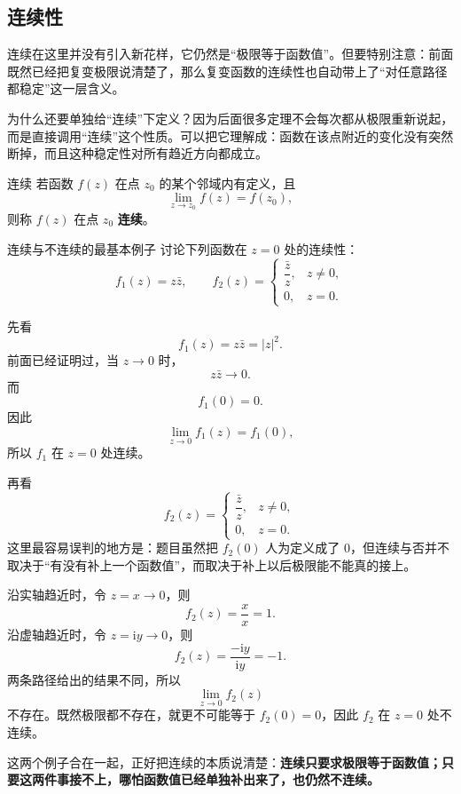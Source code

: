 \subsection{连续性}

连续在这里并没有引入新花样，它仍然是``极限等于函数值''。但要特别注意：前面既然已经把复变极限说清楚了，那么复变函数的连续性也自动带上了``对任意路径都稳定''这一层含义。

为什么还要单独给``连续''下定义？因为后面很多定理不会每次都从极限重新说起，而是直接调用``连续''这个性质。可以把它理解成：函数在该点附近的变化没有突然断掉，而且这种稳定性对所有趋近方向都成立。

\begin{dingliyi}{连续}{}
若函数 $f(z)$ 在点 $z_0$ 的某个邻域内有定义，且
\begin{equation}
    \lim_{z\to z_0}f(z)=f(z_0),
\end{equation}
则称 $f(z)$ 在点 $z_0$ \textbf{连续}。
\end{dingliyi}

\begin{lizi}{连续与不连续的最基本例子}{}
讨论下列函数在 $z=0$ 处的连续性：
\[
    f_1(z)=z\bar z,\qquad
    f_2(z)=
    \begin{cases}
        \dfrac{\bar z}{z},& z\neq 0,\\
        0,& z=0.
    \end{cases}
\]

\begin{jie}
先看
\[
    f_1(z)=z\bar z=|z|^2.
\]
前面已经证明过，当 $z\to 0$ 时，
\[
    z\bar z\to 0.
\]
而
\[
    f_1(0)=0.
\]
因此
\[
    \lim_{z\to 0}f_1(z)=f_1(0),
\]
所以 $f_1$ 在 $z=0$ 处连续。

再看
\[
    f_2(z)=
    \begin{cases}
        \dfrac{\bar z}{z},& z\neq 0,\\
        0,& z=0.
    \end{cases}
\]
这里最容易误判的地方是：题目虽然把 $f_2(0)$ 人为定义成了 $0$，但连续与否并不取决于``有没有补上一个函数值''，而取决于补上以后极限能不能真的接上。

沿实轴趋近时，令 $z=x\to 0$，则
\[
    f_2(z)=\frac{x}{x}=1.
\]
沿虚轴趋近时，令 $z=\mathrm{i}y\to 0$，则
\[
    f_2(z)=\frac{-\mathrm{i}y}{\mathrm{i}y}=-1.
\]
两条路径给出的结果不同，所以
\[
    \lim_{z\to 0}f_2(z)
\]
不存在。既然极限都不存在，就更不可能等于 $f_2(0)=0$，因此 $f_2$ 在 $z=0$ 处不连续。

这两个例子合在一起，正好把连续的本质说清楚：\textbf{连续只要求极限等于函数值；只要这两件事接不上，哪怕函数值已经单独补出来了，也仍然不连续。}
\end{jie}
\end{lizi}

